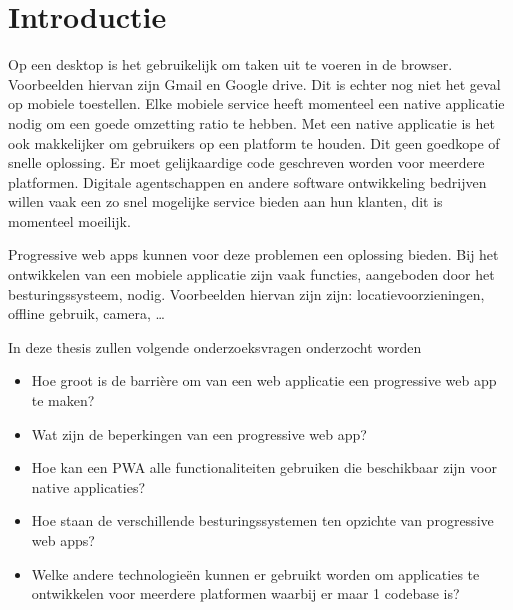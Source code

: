 
\section{Introductie} %
\label{sec:introductie}

Op een desktop is het gebruikelijk om taken uit te voeren in de browser. Voorbeelden hiervan zijn Gmail en Google drive. Dit is echter nog niet het geval op mobiele toestellen. Elke mobiele service heeft momenteel een native applicatie nodig om een goede omzetting ratio te hebben. Met een native applicatie is het ook makkelijker om gebruikers op een platform te houden.
Dit geen goedkope of snelle oplossing. Er moet gelijkaardige code geschreven worden voor meerdere platformen. Digitale agentschappen en andere software ontwikkeling bedrijven willen vaak een zo snel mogelijke service bieden aan hun klanten, dit is momenteel moeilijk.

Progressive web apps kunnen voor deze problemen een oplossing bieden.
Bij het ontwikkelen van een mobiele applicatie zijn vaak functies, aangeboden door het besturingssysteem, nodig. Voorbeelden hiervan zijn zijn: locatievoorzieningen, offline gebruik, camera, …

In deze thesis zullen volgende onderzoeksvragen onderzocht worden
\begin{itemize}
    \item Hoe groot is de barrière om van een web applicatie  een progressive web app te maken?
    \item Wat zijn de beperkingen van een progressive web app?
    \item Hoe kan een PWA alle functionaliteiten gebruiken die beschikbaar zijn voor native applicaties?
    \item Hoe staan de verschillende besturingssystemen ten opzichte van progressive web apps?
    \item Welke andere technologieën kunnen er gebruikt worden om applicaties te ontwikkelen voor meerdere platformen waarbij er maar 1 codebase is?
\end{itemize}

 




